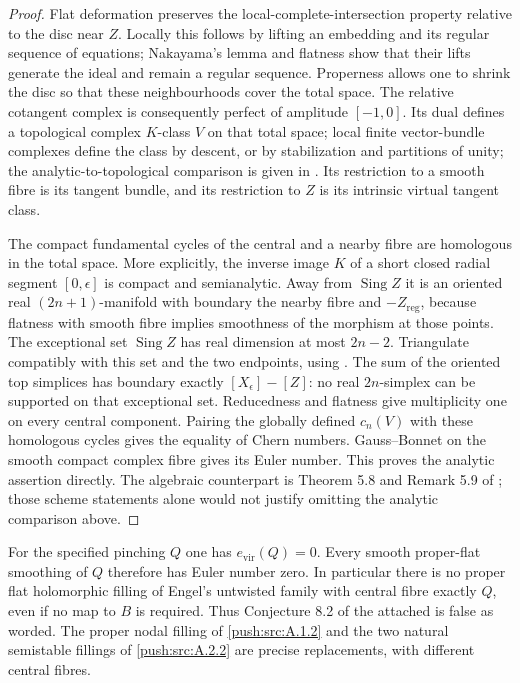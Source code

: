 \begin{proof}
Flat deformation preserves the local-complete-intersection
property relative to the disc near $Z$. Locally this follows by
lifting an embedding and its regular sequence of equations;
Nakayama's lemma and flatness show that their lifts generate
the ideal and remain a regular sequence. Properness allows one
to shrink the disc so that these neighbourhoods cover the total
space. The relative cotangent complex is consequently perfect
of amplitude $[-1,0]$. Its dual defines a topological complex
$K$-class $V$ on that total space; local finite vector-bundle
complexes define the class by descent, or by stabilization and
partitions of unity; the analytic-to-topological comparison is
given in \cite[Lemmas 3.1--3.2 and Section 3.1]{Levy08}.
Its restriction to a smooth fibre is its
tangent bundle, and its restriction to $Z$ is its intrinsic
virtual tangent class.

The compact fundamental cycles of the central and a nearby
fibre are homologous in the total space. More explicitly,
the inverse image $K$ of a short closed radial segment
$[0,\epsilon]$ is compact and semianalytic. Away from
$\operatorname{Sing}Z$ it is an oriented real
$(2n+1)$-manifold with boundary the nearby fibre and
$-Z_{\mathrm{reg}}$, because flatness with smooth fibre
implies smoothness of the morphism at those points.
The exceptional set $\operatorname{Sing}Z$ has real
dimension at most $2n-2$. Triangulate compatibly with
this set and the two endpoints, using
\cite[Section 3, Theorems 1--2]{Loj64}. The sum of the
oriented top simplices has boundary exactly
$[X_\epsilon]-[Z]$: no real $2n$-simplex can be supported
on that exceptional set. Reducedness and flatness give
multiplicity one on every central component. Pairing the globally defined
$c_n(V)$ with these homologous cycles gives the equality of
Chern numbers. Gauss--Bonnet on the smooth compact complex
fibre gives its Euler number. This proves the analytic assertion
directly. The algebraic counterpart is Theorem 5.8 and
Remark 5.9 of \cite{FG10}; those scheme statements alone would
not justify omitting the analytic comparison above.
\end{proof}

\begin{theorem}\label{push:src:A.3.2}\label{push:A32}
For the specified pinching $Q$ one has $e_{\mathrm{vir}}(Q)=0$.
Every smooth proper-flat smoothing of $Q$ therefore has Euler
number zero. In particular there is no proper flat holomorphic
filling of Engel's untwisted family with central fibre exactly
$Q$, even if no map to $B$ is required. Thus Conjecture 8.2
of the attached \cite{Engel2026} is false as worded. The proper nodal
filling of \ref{push:src:A.1.2} and the two natural semistable fillings of
\ref{push:src:A.2.2} are precise replacements, with different central fibres.
\end{theorem}

